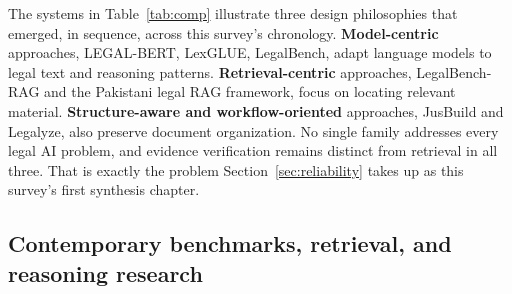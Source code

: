 The systems in Table~\ref{tab:comp} illustrate three design philosophies that emerged, in sequence,
across this survey's chronology. \textbf{Model-centric} approaches, LEGAL-BERT, LexGLUE, LegalBench,
adapt language models to legal text and reasoning patterns. \textbf{Retrieval-centric} approaches,
LegalBench-RAG and the Pakistani legal RAG framework, focus on locating relevant material.
\textbf{Structure-aware and workflow-oriented} approaches, JusBuild and Legalyze, also preserve
document organization. No single family addresses every legal AI problem, and evidence verification
remains distinct from retrieval in all three. That is exactly the problem
Section~\ref{sec:reliability} takes up as this survey's first synthesis chapter.

\subsection{Contemporary benchmarks, retrieval, and reasoning research}

